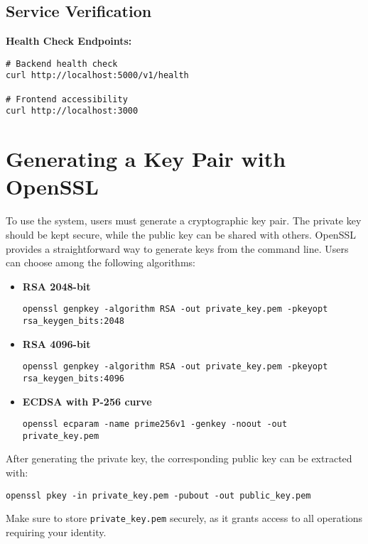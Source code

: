 \subsection{Service Verification}

\textbf{Health Check Endpoints:}
\begin{verbatim}
# Backend health check
curl http://localhost:5000/v1/health

# Frontend accessibility
curl http://localhost:3000
\end{verbatim}

\section{Generating a Key Pair with OpenSSL}

To use the system, users must generate a cryptographic key pair. 
The private key should be kept secure, while the public key can be shared with others. 
OpenSSL provides a straightforward way to generate keys from the command line. 
Users can choose among the following algorithms:

\begin{itemize}
    \item \textbf{RSA 2048-bit}
    \begin{verbatim}
openssl genpkey -algorithm RSA -out private_key.pem -pkeyopt rsa_keygen_bits:2048
    \end{verbatim}

    \item \textbf{RSA 4096-bit}
    \begin{verbatim}
openssl genpkey -algorithm RSA -out private_key.pem -pkeyopt rsa_keygen_bits:4096
    \end{verbatim}

    \item \textbf{ECDSA with P-256 curve}
    \begin{verbatim}
openssl ecparam -name prime256v1 -genkey -noout -out private_key.pem
    \end{verbatim}
\end{itemize}

After generating the private key, the corresponding public key can be extracted with:

\begin{verbatim}
openssl pkey -in private_key.pem -pubout -out public_key.pem
\end{verbatim}

Make sure to store \texttt{private\_key.pem} securely, as it grants access to all operations requiring your identity.
